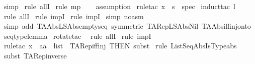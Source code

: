 \begin{isabellebody}
\isamarkupfalse%
\ simp\isanewline
{}\isamarkupfalse%
\ {\isacharparenleft}rule\ allI{\isacharparenright}\isanewline
{}\isamarkupfalse%
\ {\isacharparenleft}rule\ mp{\isacharparenright}\isanewline
{}\isamarkupfalse%
\ {}\ \isanewline
{}\isamarkupfalse%
\ {\isacharparenleft}assumption{\isacharparenright}\isanewline
{}\isamarkupfalse%
\ {\isacharparenleft}rule{\isacharunderscore}tac\ x\ {\isacharequal}\ {\isachardoublequoteopen}s{\isachardoublequoteclose}\ \ spec{\isacharparenright}\isanewline
{}\isamarkupfalse%
\ {\isacharparenleft}induct{\isacharunderscore}tac\ {\isachardoublequoteopen}l{\isachardoublequoteclose}{\isacharparenright}\isanewline
{}\isamarkupfalse%
\ {\isacharparenleft}rule\ allI{\isacharparenright}\isanewline
{}\isamarkupfalse%
\ {\isacharparenleft}rule\ impI{\isacharparenright}\isanewline
{}\isamarkupfalse%
\ {\isacharparenleft}rule\ impI{\isacharparenright}\isanewline
{}\isamarkupfalse%
\ {\isacharparenleft}simp\ {\isacharparenleft}no{\isacharunderscore}asm{\isacharparenright}{\isacharparenright}\isanewline
{}\isamarkupfalse%
\ {\isacharparenleft}simp\ add{\isacharcolon}\ TAAbs{\isacharunderscore}LSAbs{\isacharunderscore}emptyseq\ {\isacharbrackleft}symmetric{\isacharbrackright}\ TARep{\isacharunderscore}LSAbs{\isacharunderscore}Nil\ TAAbs{\isacharunderscore}iff{\isacharunderscore}inj{\isacharunderscore}onto\ seqtype{\isacharunderscore}lemma{\isacharparenright}\isanewline
{}\isamarkupfalse%
\ {\isacharparenleft}rotate{\isacharunderscore}tac\ {\isacharminus}{}{\isacharparenright}\isanewline
{}\isamarkupfalse%
\ {\isacharparenleft}rule\ allI{\isacharparenright}\isanewline
{}\isamarkupfalse%
\ {\isacharparenleft}rule\ impI{\isacharparenright}\isanewline
{}\isamarkupfalse%
\ {\isacharparenleft}rule{\isacharunderscore}tac\ x{}\ {\isacharequal}\ {\isachardoublequoteopen}aa\ {\isacharhash}\ list{\isachardoublequoteclose}\ \ TARep{\isacharunderscore}iff{\isacharunderscore}inj\ {\isacharbrackleft}THEN\ subst{\isacharbrackright}{\isacharparenright}\isanewline
{}\isamarkupfalse%
\ {\isacharparenleft}rule\ ListSeqAbsIsTypeabs{\isacharparenright}\isanewline
{}\isamarkupfalse%
\ {\isacharparenleft}subst\ TARep{\isacharunderscore}inverse{\isacharparenright}\isanewline
{}\isamarkupfalse%

\end{isabellebody}
